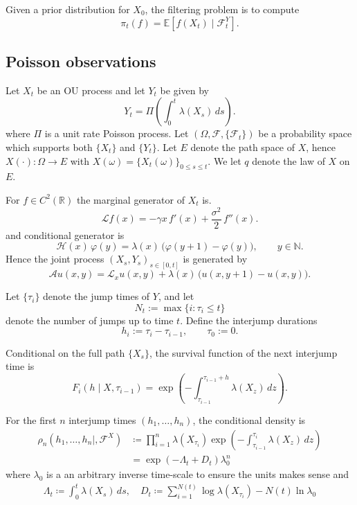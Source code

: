 \documentclass[11pt]{article}
\begin{document}
Given a prior distribution for $X_0$, the filtering problem is to compute
\begin{equation}
\pi_t(f)
=
\mathbb E\!\left[f(X_t)\mid \mathcal F_t^Y\right].
\end{equation}

\subsection*{Poisson observations}

Let $X_t$ be an OU process and let $Y_t$ be given by 
\begin{equation}
Y_t = \Pi\!\left(\int_0^t \lambda(X_s)\,ds\right).
\end{equation}
where $\Pi$ is a unit rate Poisson process. Let $(\Omega, {\mathcal F},\{{\mathcal F}_t\})$ be a probability space which supports both $\{X_t\}$ and $\{Y_t\}$. Let $E$ denote the path space of $X$, hence $X(\cdot): \Omega \to E$ with $X(\omega) = \{X_t(\omega)\}_{0 \le s \le t}$. We let $q$ denote the law of $X$ on $E$. 

For $f\in C^2(\mathbb R)$ the marginal generator of $X_t$ is. 
\begin{equation}
\mathcal L f(x)
=
-\gamma x\, f'(x)
+
\frac{\sigma^2}{2}\, f''(x).
\end{equation}
and conditional generator is
\begin{equation}
\mathcal H(x)\,\varphi(y)
=
\lambda(x)\,\big(\varphi(y+1)-\varphi(y)\big),
\qquad y\in\mathbb N.
\end{equation}
Hence the joint process $(X_s,Y_s)_{s \in [0,t]}$ is generated by 
\begin{equation}
\mathcal A u(x,y)
=
\mathcal L_x u(x,y)
+
\lambda(x)\,\big(u(x,y+1)-u(x,y)\big).
\end{equation}




Let $\{\tau_i\}$ denote the jump times of $Y$, and let
\[
N_t := \max\{ i : \tau_i \le t\}
\]
denote the number of jumps up to time $t$.  
Define the interjump durations
\[
h_i := \tau_i - \tau_{i-1}, \qquad \tau_0:=0.
\]

Conditional on the full path $\{X_s\}$, the survival function of the next interjump time is
\begin{equation}
F_i(h\mid X,\tau_{i-1})
=
\exp\!\left(
-\int_{\tau_{i-1}}^{\tau_{i-1}+h}\lambda(X_z)\,dz
\right).
\end{equation}

For the first $n$ interjump times $(h_1,\dots,h_n)$, the conditional density is 
\begin{align}
\rho_n(h_1,\dots,h_{n}\mid ,{\mathcal F}^X)
&\coloneqq
\prod_{i=1}^{n}
\lambda(X_{\tau_i})
\exp\!\left(
-\int_{\tau_{i-1}}^{\tau_i}\lambda(X_z)\,dz
\right)
\\
&=
\exp\!\left(
-\Lambda_t
+
D_t
\right)\lambda_0^{n}
\end{align}
where $\lambda_0$ is a an arbitrary inverse time-scale to ensure the units makes sense and 
\begin{align}
\Lambda_t  \coloneqq \int_0^{t} \lambda(X_s)\,ds,\quad 
D_t \coloneqq \sum_{i=1}^{N(t)} \log \lambda(X_{\tau_i}) - N(t)\ln \lambda_0 
\end{align}
\end{document}
